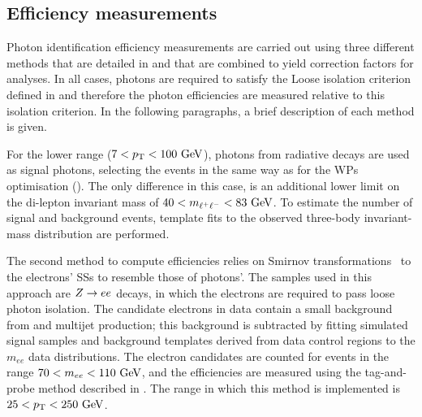 \subsection{Efficiency measurements}

Photon identification efficiency measurements are carried out using three different methods that are detailed in  and that are combined to yield correction factors for analyses. In all cases, photons are required to satisfy the Loose isolation criterion defined in  and therefore the photon efficiencies are measured relative to this isolation criterion. In the following paragraphs, a brief description of each method is given.

For the lower \pt range (\(7<p_{\text{T}}<100~\text{GeV}\)), photons from radiative \Zboson decays are used as signal photons, selecting the events in the same way as for the \acp{WP} optimisation (\Sect{\ref{subsec:pid_ss:pid:optimisation}}). The only difference in this case, is an additional lower limit on the di-lepton invariant mass of \(40<m_{\ell^{+} \ell^{-}} < 83~\text{GeV}\). To estimate the number of signal and background events, template fits to the observed three-body invariant-mass distribution are performed.

The second method to compute efficiencies relies on Smirnov transformations~\cite{SmirnovTransform} to the electrons' \acp{SS} to resemble those of photons'. The samples used in this approach are \(Z\rightarrow ee\) decays, in which the electrons are required to pass loose photon isolation. The candidate electrons in data contain a small background from \Wjets and multijet production; this background is subtracted by fitting simulated signal samples and background templates derived from data control regions to the \(m_{ee}\) data distributions. The electron candidates are counted for events in the range \(70 < m_{ee} < 110~\text{GeV}\), and the efficiencies are measured using the tag-and-probe method described in . The \pt range in which this method is implemented is \(25<p_{\text{T}}<250~\text{GeV}\).

